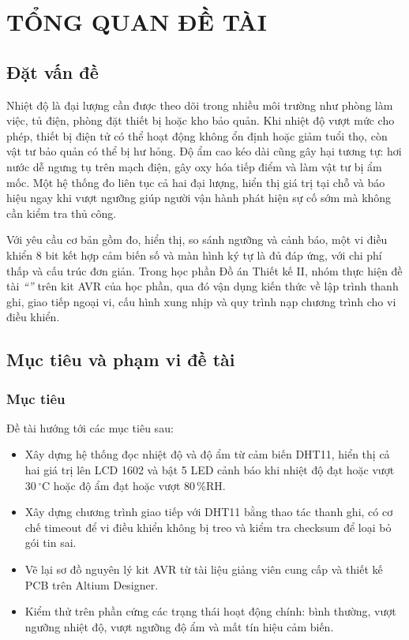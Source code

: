 \chapter{TỔNG QUAN ĐỀ TÀI}
\label{chap:overview}

\section{Đặt vấn đề}

Nhiệt độ là đại lượng cần được theo dõi trong nhiều môi trường như phòng làm việc, tủ điện, phòng đặt thiết bị hoặc kho bảo quản. Khi nhiệt độ vượt mức cho phép, thiết bị điện tử có thể hoạt động không ổn định hoặc giảm tuổi thọ, còn vật tư bảo quản có thể bị hư hỏng. Độ ẩm cao kéo dài cũng gây hại tương tự: hơi nước dễ ngưng tụ trên mạch điện, gây oxy hóa tiếp điểm và làm vật tư bị ẩm mốc. Một hệ thống đo liên tục cả hai đại lượng, hiển thị giá trị tại chỗ và báo hiệu ngay khi vượt ngưỡng giúp người vận hành phát hiện sự cố sớm mà không cần kiểm tra thủ công.

Với yêu cầu cơ bản gồm đo, hiển thị, so sánh ngưỡng và cảnh báo, một vi điều khiển 8 bit kết hợp cảm biến số và màn hình ký tự là đủ đáp ứng, với chi phí thấp và cấu trúc đơn giản. Trong học phần Đồ án Thiết kế II, nhóm thực hiện đề tài \textit{``\ReportTopic''} trên kit AVR của học phần, qua đó vận dụng kiến thức về lập trình thanh ghi, giao tiếp ngoại vi, cấu hình xung nhịp và quy trình nạp chương trình cho vi điều khiển.

\section{Mục tiêu và phạm vi đề tài}

\subsection{Mục tiêu}

Đề tài hướng tới các mục tiêu sau:
\begin{itemize}[leftmargin=1.2cm]
    \item Xây dựng hệ thống đọc nhiệt độ và độ ẩm từ cảm biến DHT11, hiển thị cả hai giá trị lên LCD 1602 và bật 5 LED cảnh báo khi nhiệt độ đạt hoặc vượt 30\,$^\circ$C hoặc độ ẩm đạt hoặc vượt 80\,\%RH.
    \item Xây dựng chương trình giao tiếp với DHT11 bằng thao tác thanh ghi, có cơ chế timeout để vi điều khiển không bị treo và kiểm tra checksum để loại bỏ gói tin sai.
    \item Vẽ lại sơ đồ nguyên lý kit AVR từ tài liệu giảng viên cung cấp và thiết kế PCB trên Altium Designer.
    \item Kiểm thử trên phần cứng các trạng thái hoạt động chính: bình thường, vượt ngưỡng nhiệt độ, vượt ngưỡng độ ẩm và mất tín hiệu cảm biến.
\end{itemize}

